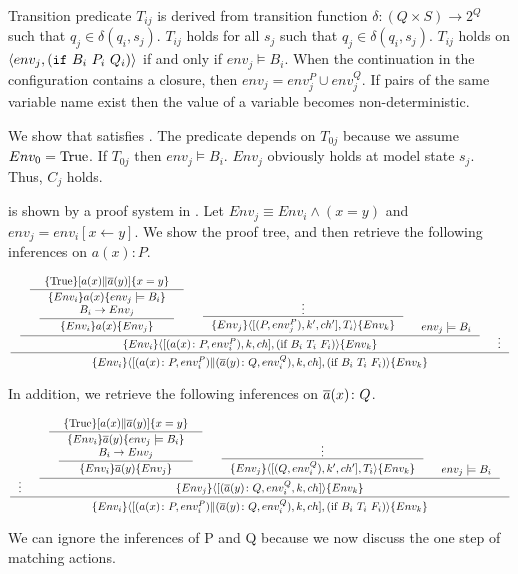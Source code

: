 \documentclass[12pt,a4paper,titlepage]{article}
\theoremstyle{break}
\begin{document}
Transition predicate \(T_{ij}\) is derived from transition function \(\delta: (Q\times S)\rightarrow 2^Q\) such that \(q_j\in\delta(q_i,s_j)\).
\(T_{ij}\) holds for all \(s_j\) such that \(q_j\in\delta(q_i,s_j)\).
\(T_{ij}\) holds on \(\langle env_j, ({\tt if}\ B_i\ P_i\ Q_i)\rangle\) if and only if \(env_j\models B_i\).
When the continuation in the configuration contains a closure, then \(env_j=env_j^P\cup env_j^Q\).
If pairs of the same variable name exist then the value of a variable becomes non-deterministic.

We show that \NHK satisfies .
The predicate depends on \(T_{0j}\) because we assume \(Env_0=\mathop{\mathrm{True}}\nolimits\).
If \(T_{0j}\) then \(env_j\models B_i\).
\(Env_j\) obviously holds at model state \(s_j\).
Thus, \(C_j\) holds.

 is shown by a proof system in .
Let \(Env_j\equiv Env_i\wedge(x=y)\) and \(env_j=env_i[x\leftarrow y]\).
We show the proof tree, and then retrieve the following inferences on \(a(x)\colon P\).
  \begin{center}
    \begin{math}
\inference{
  \inference{
    \inference{\{\Truerm\}[a(x)\|\bijection{a}(y)]\{x=y\}}
    {\inference{\{Env_i\}a(x)\{env_j\models B_i\}\\
                  B_i\rightarrow Env_j} {\{Env_i\}a(x)\{Env_j\}}}&
     \inference{\vdots}
     {\{Env_j\}\langle[(P,env_j^P),k',ch'],T_i\rangle\{Env_k\}}&env_j\models B_i}
  {\{Env_i\}\langle[(a(x)\colon P,env_i^P),k,ch],(\mbox{if}\ B_i\ T_i\ F_i)\rangle\{Env_k\}}&\vdots}
{\{Env_i\}\langle[(a(x)\colon P,env_i^P)\|(\bijection{a}(y)\colon Q,env_i^Q),k,ch],(\mbox{if}\ B_i\ T_i\ F_i)\rangle\{Env_k\}}
    \end{math}
  \end{center}
In addition, we retrieve the following inferences on \(\mbox{$\overline{a}$}(x)\colon Q\).
  \begin{center}
    \begin{math}
\inference{
  \vdots&
    \inference{\inference{\{\Truerm\}[a(x)\|\bijection{a}(y)]\{x=y\}}
               {\inference{\{Env_i\}\bijection{a}(y)\{env_j\models B_i\}\\B_i\rightarrow Env_j}
                {\{Env_i\}\bijection{a}(y)\{Env_j\}}}&
                   \inference{\vdots}
                   {\{Env_j\}\langle[(Q,env_i^Q),k',ch'],T_i\rangle\{Env_k\}}&env_j\models B_i}
   {\{Env_j\}\langle[(\bijection{a}(y)\colon Q,env_i^Q,k,ch]\rangle\{Env_k\}}}
{\{Env_i\}\langle[(a(x)\colon P,env_i^P)\|(\bijection{a}(y)\colon Q,env_i^Q),k,ch],(\mbox{if}\ B_i\ T_i\ F_i)\rangle\{Env_k\}}
    \end{math}
  \end{center}
We can ignore the inferences of P and Q because we now discuss the one step of matching actions.
\end{document}
